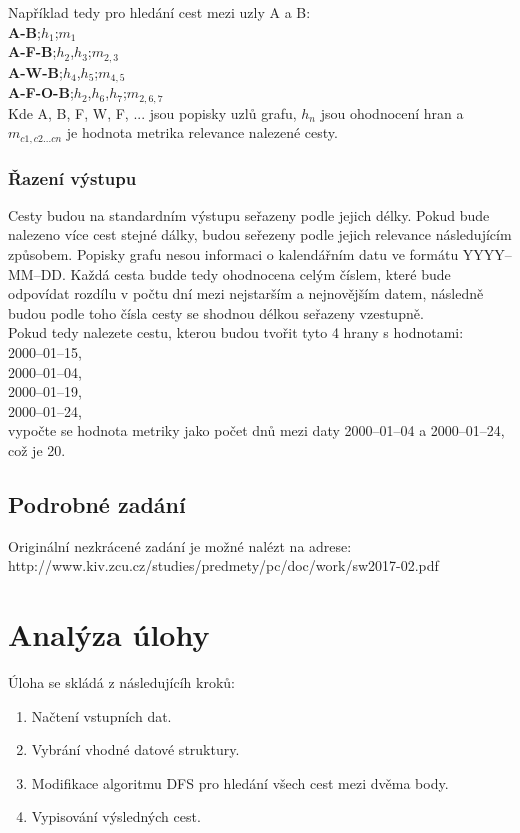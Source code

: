 Například tedy pro hledání cest mezi uzly A a B:\\

\textbf{A-B};$h_{1}$;$m_{1}$\\
\textbf{A-F-B};$h_{2}$,$h_{3}$;$m_{2,3}$\\
\textbf{A-W-B};$h_{4}$,$h_{5}$;$m_{4,5}$\\
\textbf{A-F-O-B};$h_{2}$,$h_{6}$,$h_{7}$;$m_{2,6,7}$\\


Kde A, B, F, W, F, ... jsou popisky uzlů grafu, $h_{n}$ jsou ohodnocení hran a $m_{c1,c2...cn}$ je hodnota metrika relevance nalezené cesty.

\subsection{Řazení výstupu}
Cesty budou na standardním výstupu seřazeny podle jejich délky. Pokud bude nalezeno více cest stejné dálky, budou seřezeny podle jejich relevance následujícím způsobem. Popisky grafu nesou informaci o kalendářním datu ve formátu YYYY--MM--DD. Každá cesta budde tedy ohodnocena celým číslem, které bude odpovídat rozdílu v počtu dní mezi nejstarším a nejnovějším datem, následně budou podle toho čísla cesty se shodnou délkou seřazeny vzestupně.\\

Pokud tedy nalezete cestu, kterou budou tvořit tyto 4 hrany s hodnotami:\\

2000--01--15,\\
2000--01--04,\\
2000--01--19,\\
2000--01--24,\\

vypočte se hodnota metriky jako počet dnů mezi daty 2000--01--04 a 2000--01--24, což je 20.

\section{Podrobné zadání}
Originální nezkrácené zadání je možné nalézt na adrese:\\

http://www.kiv.zcu.cz/studies/predmety/pc/doc/work/sw2017-02.pdf

\setcounter{page}{1}

\chapter{Analýza úlohy}
Úloha se skládá z následujícíh kroků:
\begin{enumerate}
	\item Načtení vstupních dat.
	\item Vybrání vhodné datové struktury.
	\item Modifikace algoritmu DFS pro hledání všech cest mezi dvěma body.
	\item Vypisování výsledných cest.
\end{enumerate}


